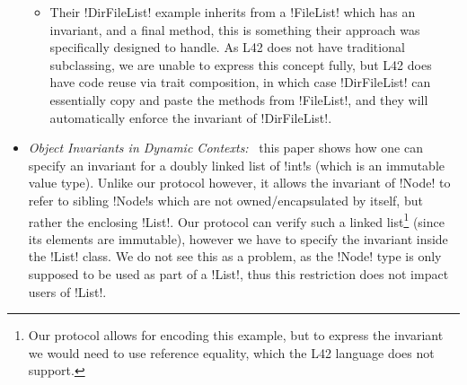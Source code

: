 \begin{itemize}
\begin{itemize}
		\item Their \Q!DirFileList! example inherits from a \Q!FileList! which has an invariant, and a final method, this is something their approach was specifically designed to handle. As L42 does not have traditional subclassing, we are unable to express this concept fully, but L42 does have code reuse via trait composition, in which case \Q!DirFileList! can essentially copy and paste the methods from \Q!FileList!, and they will automatically enforce the invariant of \Q!DirFileList!. %
	\end{itemize}

	\item \emph{Object Invariants in Dynamic Contexts:}~\cite{DBLP:conf/ecoop/LeinoM04} this paper shows how one can specify an invariant for a doubly linked list of \Q!int!s (which is an immutable value type). Unlike our protocol however, it allows the invariant of \Q!Node! to refer to sibling \Q!Node!s which are not owned/encapsulated by itself, but rather the enclosing \Q!List!. Our protocol can verify such a linked list\footnote{%
Our protocol allows for encoding this example, but
to express the invariant we would need to 
use reference equality, which the L42 language does not support.
} (since its elements are immutable), however we have to specify the invariant inside the \Q!List! class. We do not see this as a problem, as the \Q!Node! type is only supposed to be used as part of a \Q!List!, thus this restriction does not impact users of \Q!List!.
	

\end{itemize}

